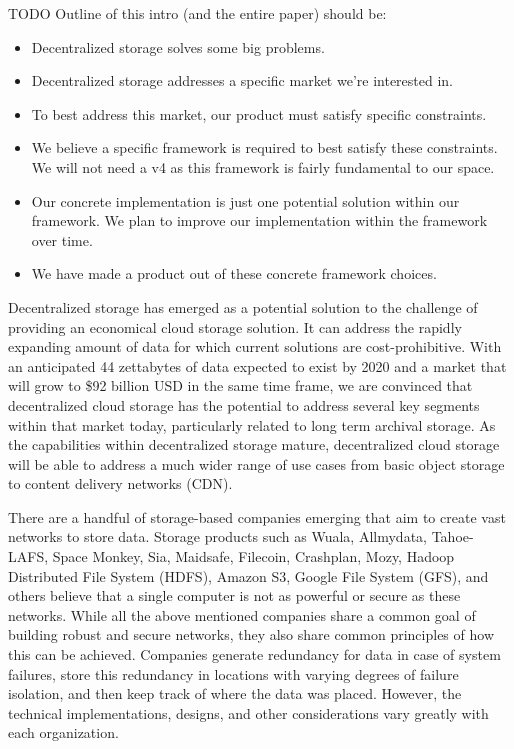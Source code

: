 \documentclass[a4paper,10pt]{article} \usepackage[utf8]{inputenc}
\newcommand{\todo}[1]{{\color{red} TODO #1 }}
\begin{document}
\todo{
Outline of this intro (and the entire paper) should be:
\begin{itemize}
\item Decentralized storage solves some big problems.
\item Decentralized storage addresses a specific market we're interested in.
\item To best address this market, our product must satisfy specific constraints.
\item We believe a specific framework is required to best satisfy these
  constraints. We will not need a v4 as this framework is fairly fundamental
  to our space.
\item Our concrete implementation is just one potential solution within our
  framework. We plan to improve our implementation within the framework over
  time.
\item We have made a product out of these concrete framework choices.
\end{itemize}
}

Decentralized storage has emerged as a potential solution to the challenge of
providing an economical cloud storage solution. It can address the rapidly
expanding amount of data for which current solutions are cost-prohibitive.
With an anticipated 44 zettabytes of data expected to exist by 2020 and a
market that will grow to \$92 billion USD in the same time frame, we are
convinced that decentralized cloud storage has the potential to address several
key segments within that market today, particularly related to long term
archival storage.
As the capabilities within decentralized storage mature, decentralized cloud
storage will be able to address a much wider range of use cases from basic
object storage to content delivery networks (CDN).

There are a handful of storage-based companies emerging that aim to create vast
networks to store data.
Storage products such as Wuala, Allmydata, Tahoe-LAFS, Space Monkey, Sia,
Maidsafe, Filecoin, Crashplan, Mozy, Hadoop Distributed File System (HDFS),
Amazon S3, Google File System (GFS), and others believe that a single computer
is not as powerful or secure as these networks.
While all the above mentioned companies share a common goal of building robust
and secure networks, they also share common principles of how this can be
achieved.
Companies generate redundancy for data in case of system failures, store this
redundancy in locations with varying degrees of failure isolation, and then
keep track of where the data was placed.
However, the technical implementations, designs, and other considerations
vary greatly with each organization.
\end{document}
